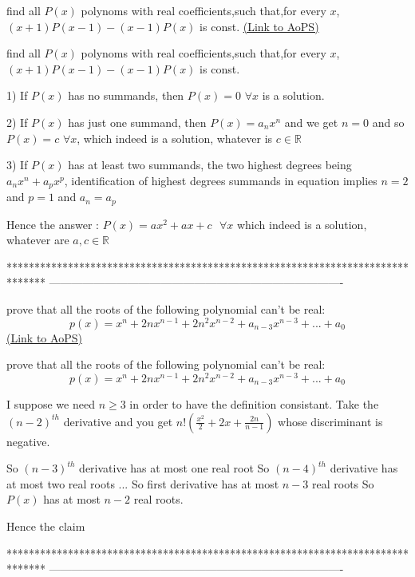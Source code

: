 \begin{problem}
	find all $ P(x) $ polynoms with real coefficients,such that,for every $x$, $ (x+1)P(x-1)-(x-1)P(x) $ is const.
	\flushright \href{https://artofproblemsolving.com/community/c6h586443}{(Link to AoPS)}
\end{problem}



\begin{solution}
	\begin{tcolorbox}find all $ P(x) $ polynoms with real coefficients,such that,for every $x$, $ (x+1)P(x-1)-(x-1)P(x) $ is const.\end{tcolorbox}

1) If $P(x)$ has no summands, then $P(x)=0$ $\forall x$ is a solution.

2) If $P(x)$ has just one summand, then $P(x)=a_nx^n$ and we get $n=0$ and so  $P(x)=c$ $\forall x$, which indeed is a solution, whatever is $c\in\mathbb R$

3) If $P(x)$ has at least two summands, the two highest degrees being $a_nx^n+a_px^p$, identification of highest degrees summands in equation implies $n=2$ and $p=1$ and $a_n=a_p$ 

Hence the answer : $\boxed{P(x)=ax^2+ax+c\text{   }\forall x}$ which indeed is a solution, whatever are $a,c\in\mathbb R$
\end{solution}
*******************************************************************************
-------------------------------------------------------------------------------

\begin{problem}
	prove that all the roots of the following polynomial can't be real:\[p(x)=x^n+2nx^{n-1}+2n^2x^{n-2}+a_{n-3}x^{n-3}+...+a_{0}\]
	\flushright \href{https://artofproblemsolving.com/community/c6h586453}{(Link to AoPS)}
\end{problem}



\begin{solution}
	\begin{tcolorbox}prove that all the roots of the following polynomial can't be real:\[p(x)=x^n+2nx^{n-1}+2n^2x^{n-2}+a_{n-3}x^{n-3}+...+a_{0}\]\end{tcolorbox}
I suppose we need $n\ge 3$ in order to have the definition consistant.
Take the $(n-2)^{th}$ derivative and you get $n!(\frac {x^2}2+2x+\frac {2n}{n-1})$ whose discriminant is negative.

So $(n-3)^{th}$ derivative has at most one real root
So $(n-4)^{th}$ derivative has at most two real roots
...
So first derivative has at most $n-3$ real roots
So $P(x)$ has at most $n-2$ real roots.

Hence the claim
\end{solution}
*******************************************************************************
-------------------------------------------------------------------------------

